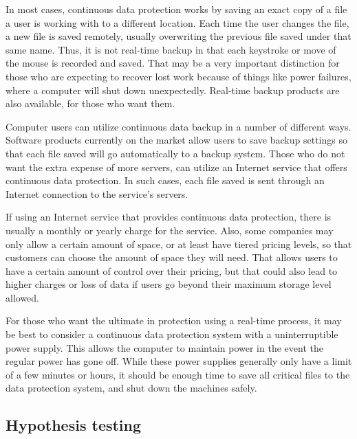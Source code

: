  

In most cases, continuous data protection works by saving an exact copy of a file a user is working with to a different location. Each time the user changes the file, a new file is saved remotely, usually overwriting the previous file saved under that same name. Thus, it is not real-time backup in that each keystroke or move of the mouse is recorded and saved. That may be a very important distinction for those who are expecting to recover lost work because of things like power failures, where a computer will shut down unexpectedly. Real-time backup products are also available, for those who want them.

 

Computer users can utilize continuous data backup in a number of different ways. Software products currently on the market allow users to save backup settings so that each file saved will go automatically to a backup system. Those who do not want the extra expense of more servers, can utilize an Internet service that offers continuous data protection. In such cases, each file saved is sent through an Internet connection to the service's servers.

 

If using an Internet service that provides continuous data protection, there is usually a monthly or yearly charge for the service. Also, some companies may only allow a certain amount of space, or at least have tiered pricing levels, so that customers can choose the amount of space they will need. That allows users to have a certain amount of control over their pricing, but that could also lead to higher charges or loss of data if users go beyond their maximum storage level allowed.

 

For those who want the ultimate in protection using a real-time process, it may be best to consider a continuous data protection system with a uninterruptible power supply. This allows the computer to maintain power in the event the regular power has gone off. While these power supplies generally only have a limit of a few minutes or hours, it should be enough time to save all critical files to the data protection system, and shut down the machines safely.

 



\subsection{Hypothesis testing}

